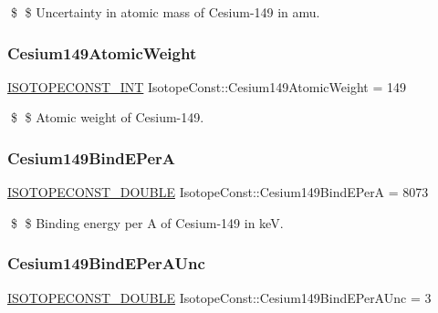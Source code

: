 \$ \$ Uncertainty in atomic mass of Cesium-\/149 in amu. \mbox{\label{group___isotope_const-_cesium-_cs149_gaf5e434c1e1eebaa4348473542f008da9}} 
\subsubsection{\texorpdfstring{Cesium149\+Atomic\+Weight}{Cesium149AtomicWeight}}
{\footnotesize\ttfamily \mbox{\hyperlink{group___isotope_const-_macros_ga5f18360b3e99483a35c32d789e62621c}{I\+S\+O\+T\+O\+P\+E\+C\+O\+N\+S\+T\+\_\+\+I\+NT}} Isotope\+Const\+::\+Cesium149\+Atomic\+Weight = 149}

\$ \$ Atomic weight of Cesium-\/149. \mbox{\label{group___isotope_const-_cesium-_cs149_ga299c76ee0fc4419927973d18acb6f033}} 
\subsubsection{\texorpdfstring{Cesium149\+Bind\+E\+PerA}{Cesium149BindEPerA}}
{\footnotesize\ttfamily \mbox{\hyperlink{group___isotope_const-_macros_ga8f45a7272ce02c0b4c65c44636ed719a}{I\+S\+O\+T\+O\+P\+E\+C\+O\+N\+S\+T\+\_\+\+D\+O\+U\+B\+LE}} Isotope\+Const\+::\+Cesium149\+Bind\+E\+PerA = 8073}

\$ \$ Binding energy per A of Cesium-\/149 in keV. \mbox{\label{group___isotope_const-_cesium-_cs149_ga09e024c226a6d2f0d559d659170dd03a}} 
\subsubsection{\texorpdfstring{Cesium149\+Bind\+E\+Per\+A\+Unc}{Cesium149BindEPerAUnc}}
{\footnotesize\ttfamily \mbox{\hyperlink{group___isotope_const-_macros_ga8f45a7272ce02c0b4c65c44636ed719a}{I\+S\+O\+T\+O\+P\+E\+C\+O\+N\+S\+T\+\_\+\+D\+O\+U\+B\+LE}} Isotope\+Const\+::\+Cesium149\+Bind\+E\+Per\+A\+Unc = 3}

